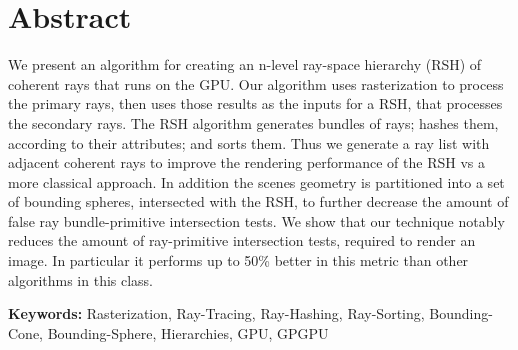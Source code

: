 
\section*{Abstract}


We present an algorithm for creating an n-level ray-space hierarchy (RSH) of coherent rays that runs on the GPU. Our algorithm uses rasterization to process the primary rays, then uses those results as the inputs for a RSH, that processes the secondary rays. The RSH algorithm generates bundles of rays; hashes them, according to their attributes; and sorts them. Thus we generate a ray list with adjacent coherent rays to improve the rendering performance of the RSH vs a more classical approach. In addition the scenes geometry is partitioned into a set of bounding spheres, intersected with the RSH, to further decrease the amount of false ray bundle-primitive intersection tests. We show that our technique notably reduces the amount of ray-primitive intersection tests, required to render an image. In particular it performs up to 50\% better in this metric than other algorithms in this class.

\vfill

\textbf{\Large Keywords:} {Rasterization, Ray-Tracing, Ray-Hashing, Ray-Sorting, Bounding-Cone, Bounding-Sphere, Hierarchies, GPU, GPGPU}

